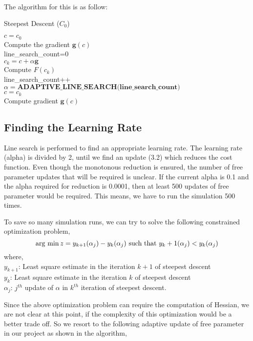 \documentclass[10pt,a4paper]{report}
\newcommand{\argmin}{\mathop{\rm arg~min}\limits}
\begin{document}
The algorithm for this is as follow:
\begin{algorithm}[t]
\caption{Steepest Descent ($C_0$)}

  $c=c_{0}$\\
  Compute the gradient $\textbf{g}(c)$\\
  {
  line\_search\_count=0 \\
    {
	$c_{k}=c + \alpha \textbf{g}$\\
	Compute $F(c_{k})$\\
	line\_search\_count++ \\
	$\alpha =\textbf{ADAPTIVE\_LINE\_SEARCH(line\_search\_count)}$\\
    }
    $c=c_{k}$\\
    Compute gradient $\textbf{g}(c)$\\
  }
\end{algorithm}
\pagebreak
\subsection{Finding the Learning Rate}

Line search is performed to find an appropriate learning rate. The learning rate (alpha) is divided by 2, until we find an update (3.2) which reduces the cost function. Even though the monotonous reduction is ensured, the number of free parameter updates that will be required is unclear. If the current alpha is 0.1 and the alpha required for reduction is 0.0001, then at least 500 updates of free parameter would be required. This means, we have to run the simulation 500 times. 

To save so many simulation runs, we can try to solve the following constrained optimization problem, 
\begin{equation}
\argmin z= y_{k+1}(\alpha_j)-y_k(\alpha_j)   \text{ such that } y_k+1(\alpha_j)<y_k(\alpha_j)
\end{equation}
where,\\
$y_{k+1}$: Least square estimate in the iteration $k+1$ of steepest descent\\
$y_{k}$: Least square estimate in the iteration $k$ of steepest descent\\
$\alpha_j$: $j^{th}$ update of $\alpha$ in $k^{th}$ iteration of steepest descent.

Since the above optimization problem can require the computation of Hessian,  we are not clear at this point, if the complexity of this optimization would be a better trade off. So we resort to the following adaptive update of free parameter in our project as shown in the algorithm,
\end{document}
